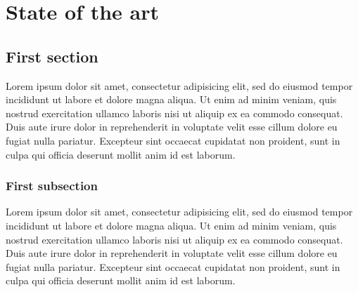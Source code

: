 \chapter{State of the art}
\setcounter{chapter}{1}
\label{chap:state-of-the-art}
\minitoc
{}

\section{First section}

Lorem ipsum dolor sit amet, consectetur adipisicing elit, sed do
eiusmod tempor incididunt ut labore et dolore magna aliqua. Ut enim ad
minim veniam, quis nostrud exercitation ullamco laboris nisi ut
aliquip ex ea commodo consequat. Duis aute irure dolor in
reprehenderit in voluptate velit esse cillum dolore eu fugiat nulla
pariatur. Excepteur sint occaecat cupidatat non proident, sunt in
culpa qui officia deserunt mollit anim id est laborum.

\subsection{First subsection}
\label{sec:image}

Lorem ipsum dolor sit amet, consectetur adipisicing elit, sed do
eiusmod tempor incididunt ut labore et dolore magna aliqua. Ut enim ad
minim veniam, quis nostrud exercitation ullamco laboris nisi ut
aliquip ex ea commodo consequat. Duis aute irure dolor in
reprehenderit in voluptate velit esse cillum dolore eu fugiat nulla
pariatur. Excepteur sint occaecat cupidatat non proident, sunt in
culpa qui officia deserunt mollit anim id est laborum.


